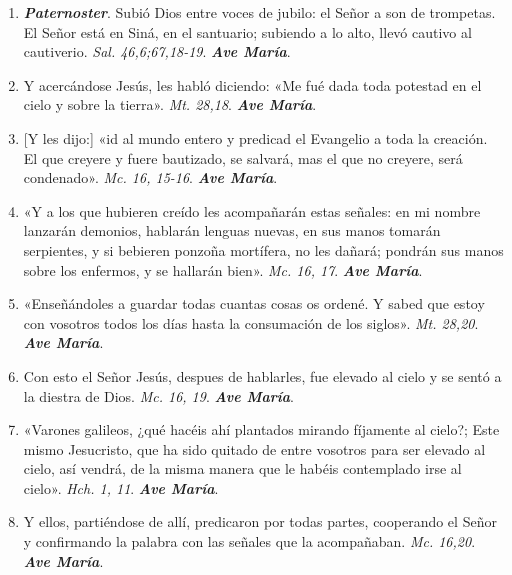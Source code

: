 \documentclass[../../devocionario.tex]{subfiles}
\begin{document}
    \begin{enumerate}
    
        \item \textbf{\textit{Paternoster}}. Subió Dios entre voces de jubilo: el Señor a son de trompetas. 
            El Señor está en Siná, en el santuario; subiendo a lo alto, llevó cautivo al cautiverio. \textit{Sal. 46,6;67,18-19}. \textbf{\textit{Ave María}}.

        \item Y acercándose Jesús, les habló diciendo: «Me fué dada toda potestad en el cielo y sobre la tierra». \textit{Mt. 28,18}. \textbf{\textit{Ave María}}.

        \item {[Y les dijo:]} «id al mundo entero y predicad el Evangelio a toda la creación. El que creyere y fuere bautizado, 
            se salvará, mas el que no creyere, será condenado». \textit{Mc. 16, 15-16}. \textbf{\textit{Ave María}}.

        \item «Y a los que hubieren creído les acompañarán estas señales: en mi nombre lanzarán demonios, 
            hablarán lenguas nuevas, en sus manos tomarán serpientes, y si bebieren ponzoña mortífera, 
            no les dañará; pondrán sus manos sobre los enfermos, y se hallarán bien». \textit{Mc. 16, 17}. \textbf{\textit{Ave María}}.

        \item «Enseñándoles a guardar todas cuantas cosas os ordené. Y sabed que estoy con vosotros todos 
            los días hasta la consumación de los siglos». \textit{Mt. 28,20}. \textbf{\textit{Ave María}}.

        \item Con esto el Señor Jesús, despues de hablarles, fue elevado al cielo y 
            se sentó a la diestra de Dios. \textit{Mc. 16, 19}. \textbf{\textit{Ave María}}.

        \item «Varones galileos, ¿qué hacéis ahí plantados mirando fíjamente al cielo?; Este mismo Jesucristo, 
            que ha sido quitado de entre vosotros para ser elevado al cielo, así vendrá, 
            de la misma manera que le habéis contemplado irse al cielo». \textit{Hch. 1, 11}. \textbf{\textit{Ave María}}.

        \item Y ellos, partiéndose de allí, predicaron por todas partes, cooperando el Señor y 
            confirmando la palabra con las señales que la acompañaban. \textit{Mc. 16,20}. \textbf{\textit{Ave María}}.


\end{enumerate}
\end{document}
